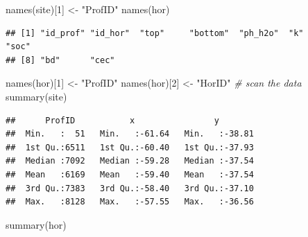 \documentclass[
  10pt,
  b5paper,
  oneside]{book}
\newenvironment{Shaded}{\begin{snugshade}}{\end{snugshade}}
\newcommand{\CommentTok}[1]{\textcolor[rgb]{0.56,0.35,0.01}{\textit{#1}}}
\newcommand{\DecValTok}[1]{\textcolor[rgb]{0.00,0.00,0.81}{#1}}
\newcommand{\FunctionTok}[1]{\textcolor[rgb]{0.00,0.00,0.00}{#1}}
\newcommand{\NormalTok}[1]{#1}
\newcommand{\OtherTok}[1]{\textcolor[rgb]{0.56,0.35,0.01}{#1}}
\newcommand{\StringTok}[1]{\textcolor[rgb]{0.31,0.60,0.02}{#1}}
\begin{document}
\begin{Shaded}
\begin{Highlighting}[]
\FunctionTok{names}\NormalTok{(site)[}\DecValTok{1}\NormalTok{] }\OtherTok{\textless{}{-}} \StringTok{"ProfID"}
\FunctionTok{names}\NormalTok{(hor)}
\end{Highlighting}
\end{Shaded}

\begin{verbatim}
## [1] "id_prof" "id_hor"  "top"     "bottom"  "ph_h2o"  "k"       "soc"    
## [8] "bd"      "cec"
\end{verbatim}

\begin{Shaded}
\begin{Highlighting}[]
\FunctionTok{names}\NormalTok{(hor)[}\DecValTok{1}\NormalTok{] }\OtherTok{\textless{}{-}} \StringTok{"ProfID"}
\FunctionTok{names}\NormalTok{(hor)[}\DecValTok{2}\NormalTok{] }\OtherTok{\textless{}{-}} \StringTok{"HorID"}
\CommentTok{\# scan the data}
\FunctionTok{summary}\NormalTok{(site)}
\end{Highlighting}
\end{Shaded}

\begin{verbatim}
##      ProfID           x                y         
##  Min.   :  51   Min.   :-61.64   Min.   :-38.81  
##  1st Qu.:6511   1st Qu.:-60.40   1st Qu.:-37.93  
##  Median :7092   Median :-59.28   Median :-37.54  
##  Mean   :6169   Mean   :-59.40   Mean   :-37.54  
##  3rd Qu.:7383   3rd Qu.:-58.40   3rd Qu.:-37.10  
##  Max.   :8128   Max.   :-57.55   Max.   :-36.56
\end{verbatim}

\begin{Shaded}
\begin{Highlighting}[]
\FunctionTok{summary}\NormalTok{(hor)}
\end{Highlighting}
\end{Shaded}
\end{document}
